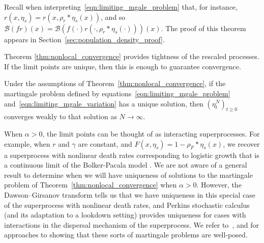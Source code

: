 \documentclass[EJP]{ejpecp} %
\newcommand{\DG}{\mathcal{B}}  %
\newcommand{\kernel}{\rho}  %
\newcommand{\smooth}[1]{\kernel_{#1} \! * \!}  %
\newcommand{\citep}[1]{\cite{#1}}
\begin{document}
Recall when interpreting~\eqref{eqn:limiting_mgale_problem}
that, for instance, $r(x, \eta_s) = r(x, \smooth{r} \eta_s(x))$,
and so $\DG(fr)(x) = \DG(f(\cdot) r(\cdot, \smooth{r} \eta_s(\cdot)))(x)$.
The proof of this theorem appears in Section~\ref{sec:population_density_proof}.

Theorem \ref{thm:nonlocal_convergence} provides tightness of the
rescaled processes. If the limit points are unique, then this
is enough to guarantee convergence.

\begin{corollary} \label{cor:superprocess_uniqueness}
    Under the assumptions of Theorem~\ref{thm:nonlocal_convergence},
    if the martingale problem
    defined by equations~\eqref{eqn:limiting_mgale_problem} 
and~\eqref{eqn:limiting_mgale_variation}
    has a unique solution,
    then $(\eta^N_t)_{t \ge 0}$ converges weakly
to that solution
    as $N \to \infty$.
\end{corollary}
When $\alpha>0$, the limit points can be thought of as interacting superprocesses. For
example, when $r$ and $\gamma$ are constant, and 
$F(x,\eta_s)=1-\smooth{F} \eta_s(x)$,
we recover a superprocess with nonlinear death rates corresponding to logistic growth
\citep{etheridge:2004}
that is a continuous limit of the Bolker-Pacala model \citep{bolker/pacala:1997,bolker/pacala:1999}.
We are not aware of a general result to determine when we will have uniqueness of 
solutions to the martingale problem of Theorem~\ref{thm:nonlocal_convergence}
when $\alpha>0$.
However, the Dawson--Girsanov transform tells us that we have uniqueness 
in this special case of the superprocess with nonlinear death rates, and 
Perkins stochastic calculus (and its adaptation to a 
lookdown setting) provides uniqueness for cases with interactions in the 
dispersal mechanism of
the superprocess. We refer 
to~\cite{dawson:1993, perkins:1992}, and \cite{donnelly/kurtz:1999} 
for approaches to showing that these sorts of martingale problems are well-posed.
\end{document}
